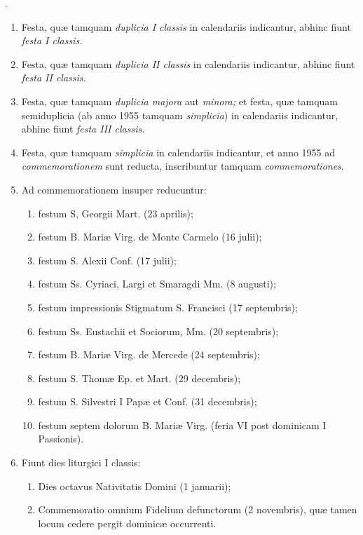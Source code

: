 \documentclass[vesperale_romanum.tex]{subfiles}
\begin{document}
.

\begin{enumerate}[nosep]
\item Festa, quæ tamquam \textit{duplicia I classis} in calendariis indicantur, abhinc fiunt \textit{festa I classis.}

\item Festa, quæ tamquam \textit{duplicia II classis} in calendariis indicantur, abhinc fiunt \textit{festa II classis.}

\item Festa, quæ tamquam \textit{duplicia majora} aut \textit{minora;} et festa, quæ tamquam semiduplicia (ab anno 1955 tamquam \textit{simplicia}) in calendariis indicantur, abhinc fiunt \textit{festa III classis.}

\item Festa, quæ tamquam \textit{simplicia} in calendariis indicantur, et anno 1955 ad \textit{commemorationem} sunt reducta, inscribuntur tamquam \textit{commemorationes}.

\item Ad commemorationem insuper reducuntur:
\begin{enumerate}[nosep,label=\alph*.]
\item festum S, Georgii Mart. (23 aprilis);
\item festum B. Mariæ Virg. de Monte Carmelo (16 julii);
\item festum S. Alexii Conf. (17 julii);
\item festum Ss. Cyriaci, Largi et Smaragdi Mm. (8 augusti);
\item festum impressionis Stigmatum S. Francisci (17 septembris);
\item festum Ss. Eustachii et Sociorum, Mm. (20 septembris);
\item festum B. Mariæ Virg. de Mercede (24 septembris);
\item festum S. Thomæ Ep. et Mart. (29 decembris);
\item festum S. Silvestri I Papæ et Conf. (31 decembris);
\item festum septem dolorum B. Mariæ Virg. (feria VI post dominicam I Passionis).
\end{enumerate}

\item Fiunt dies liturgici I classis:
\begin{enumerate}[nosep,label=\alph*.]
\item
Dies octavus Nativitatis Domini (1 januarii);
\item
 Commemoratio omnium Fidelium defun\-ctorum (2 novembris),
quæ tamen locum cedere pergit dominicæ occurrenti.
\end{enumerate}


\end{enumerate}
\end{document}
